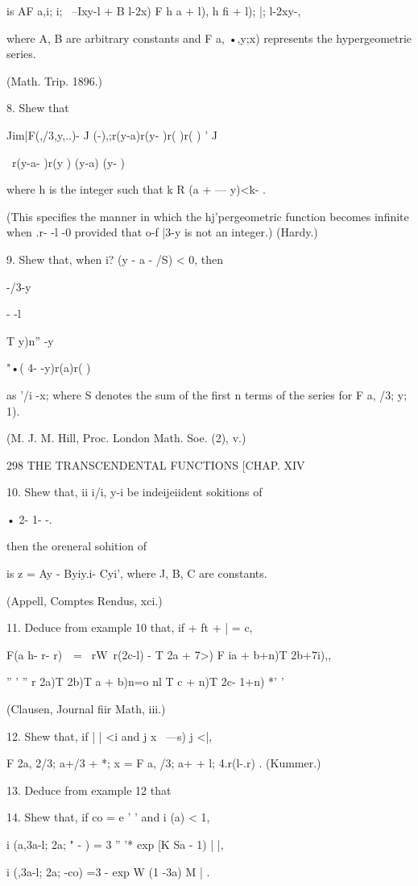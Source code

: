 is AF a,i; i; \ --Ixy-l + B l-2x) F h a + l), h fi + l); |; l-2xy-,

where A, B are arbitrary constants and F a, •,y;x) represents the
hypergeometrie series.

(Math. Trip. 1896.)

8. Shew that

Jim|F(,/3,y,..)- J (-),;r(y-a)r(y- )r( )r( ) ' J

\ r(y-a- )r(y ) (y-a) (y- )

where h is the integer such that k R (a + — y)<k- .

(This specifies the manner in which the hj'pergeometric function
becomes infinite when .r- -l -0 provided that o-f |3-y is not an
integer.) (Hardy.)

9. Shew that, when i? (y - a - /S) < 0, then

-/3-y

- -l

T y)n'' -y

 "•( 4- -y)r(a)r( )

as '/i -x; where S denotes the sum of the first n terms of the series
for F a, /3; y; 1).

(M. J. M. Hill, Proc. London Math. Soe. (2), v.)

298 THE TRANSCENDENTAL FUNCTIONS [CHAP. XIV

10. Shew that, ii i/i, y-i be indeijeiident sokitions of

• 2- 1- -.

then the oreneral sohition of

is z = Ay - Byiy.i- Cyi', where J, B, C are constants.

(Appell, Comptes Rendus, xci.)

11. Deduce from example 10 that, if + ft + | = c,

 F(a h- r- r)\ \ = \ rW\ r(2c-l) - T 2a + 7>) F ia + b+n)T 2b+7i),,

'' ' '' r 2a)T 2b)T a + b)n=o nl T c + n)T 2c- 1+n) *' '

(Clausen, Journal fiir Math, iii.)

12. Shew that, if | | <i and j x \ —s) j <|,

F 2a, 2/3; a+/3 + *; x = F a, /3; a+ + l; 4.r(l-.r) . (Kummer.)

13. Deduce from example 12 that

14. Shew that, if co = e ' ' and i (a) < 1,

i (a,3a-l; 2a; " - ) = 3 '' '* exp [K Sa - 1) | |,

i (,3a-l; 2a; -co) =3 - exp W (1 -3a) M | .

